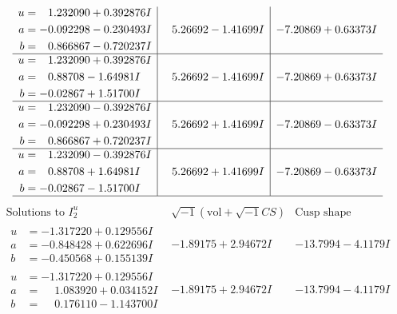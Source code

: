 \documentclass[1p]{elsarticle_modified}
\theoremstyle{definition}
\newcommand{\I}{\sqrt{-1}}
\begin{document}
$$\begin{array}{c|c|c}
\begin{aligned}
u &= \phantom{-}1.232090 + 0.392876 I \\
a &= -0.092298 - 0.230493 I \\
b &= \phantom{-}0.866867 - 0.720237 I\end{aligned}
 & \phantom{-}5.26692 - 1.41699 I & -7.20869 + 0.63373 I \\ \hline\begin{aligned}
u &= \phantom{-}1.232090 + 0.392876 I \\
a &= \phantom{-}0.88708 - 1.64981 I \\
b &= -0.02867 + 1.51700 I\end{aligned}
 & \phantom{-}5.26692 - 1.41699 I & -7.20869 + 0.63373 I \\ \hline\begin{aligned}
u &= \phantom{-}1.232090 - 0.392876 I \\
a &= -0.092298 + 0.230493 I \\
b &= \phantom{-}0.866867 + 0.720237 I\end{aligned}
 & \phantom{-}5.26692 + 1.41699 I & -7.20869 - 0.63373 I \\ \hline\begin{aligned}
u &= \phantom{-}1.232090 - 0.392876 I \\
a &= \phantom{-}0.88708 + 1.64981 I \\
b &= -0.02867 - 1.51700 I\end{aligned}
 & \phantom{-}5.26692 + 1.41699 I & -7.20869 - 0.63373 I\\
 \hline 
 \end{array}$$\newpage$$\begin{array}{c|c|c}  
\text{Solutions to }I^u_{2}& \I (\text{vol} + \sqrt{-1}CS) & \text{Cusp shape}\\
 \hline 
\begin{aligned}
u &= -1.317220 + 0.129556 I \\
a &= -0.848428 + 0.622696 I \\
b &= -0.450568 + 0.155139 I\end{aligned}
 & -1.89175 + 2.94672 I & -13.7994 - 4.1179 I \\ \hline\begin{aligned}
u &= -1.317220 + 0.129556 I \\
a &= \phantom{-}1.083920 + 0.034152 I \\
b &= \phantom{-}0.176110 - 1.143700 I\end{aligned}
 & -1.89175 + 2.94672 I & -13.7994 - 4.1179 I \\ \hline\begin{aligned}

\end{aligned}
\end{array}$$
\end{document}
